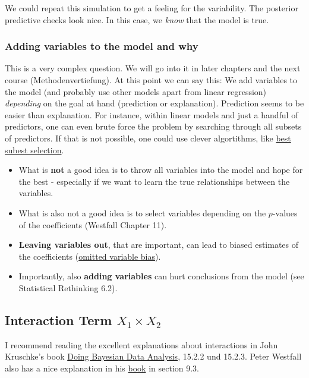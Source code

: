 \documentclass[
]{book}
\providecommand{\tightlist}{%
  \setlength{\itemsep}{0pt}\setlength{\parskip}{0pt}}
\begin{document}
We could repeat this simulation to get a feeling for the variability.
The posterior predictive checks look nice. In this case, we \emph{know} that the model is true.

\subsubsection{Adding variables to the model and why}\label{adding-variables-to-the-model-and-why}

This is a very complex question. We will go into it in later chapters and the next course (Methodenvertiefung).
At this point we can say this:
We add variables to the model (and probably use
other models apart from linear regression) \emph{depending} on the goal at hand (prediction or explanation).
Prediction seems to be easier than explanation. For instance, within linear models and
just a handful of predictors, one can even brute force the problem by searching through
all subsets of predictors. If that is not possible, one could use clever algortithms, like
\href{https://www.sthda.com/english/articles/37-model-selection-essentials-in-r/155-best-subsets-regression-essentials-in-r/}{best subest selection}.

\begin{itemize}
\tightlist
\item
  What is \textbf{not} a good idea is to throw all variables into the model and hope for the best -
  especially if we want to learn the true relationships between the variables.
\item
  What is also not a good idea is to select variables depending on the \(p\)-values of the coefficients (Westfall Chapter 11).
\item
  \textbf{Leaving variables out}, that are important, can lead to biased estimates of the coefficients
  (\href{https://en.wikipedia.org/wiki/Omitted-variable_bias}{omitted variable bias}).
\item
  Importantly, also \textbf{adding variables} can hurt conclusions from the model (see Statistical Rethinking 6.2).
\end{itemize}

\subsection{\texorpdfstring{Interaction Term \(X_1 \times X_2\)}{Interaction Term X\_1 \textbackslash times X\_2}}\label{interaction_term}

I recommend reading the excellent explanations about interactions
in John Kruschke's book \href{https://nyu-cdsc.github.io/learningr/assets/kruschke_bayesian_in_R.pdf}{Doing Bayesian Data Analysis},
15.2.2 und 15.2.3. Peter Westfall also has a nice explanation in his \href{https://www.routledge.com/Understanding-Regression-Analysis-A-Conditional-Distribution-Approach/Westfall-Arias/p/book/9780367493516?srsltid=AfmBOore3O_Ciecl0TTkr9AjPIY1d6OmbQa7o7IAdKpTSkD8s9HkwzD4}{book}
in section 9.3.
\end{document}
